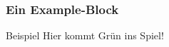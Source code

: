 \begin{frame}
	\frametitle{Ein Example-Block}

	\begin{exampleblock}{Beispiel}
		Hier kommt Grün ins Spiel!
	\end{exampleblock}
\end{frame}
